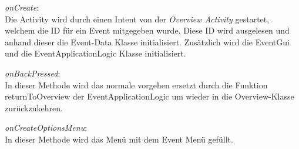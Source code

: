\textit{onCreate}:\\
Die Activity wird durch einen Intent von der \textit{Overview Activity} gestartet, welchem die ID für ein Event mitgegeben wurde. Diese ID wird ausgelesen und anhand dieser die Event-Data Klasse initialisiert. Zusätzlich wird die EventGui und die EventApplicationLogic Klasse initialisiert.

\textit{onBackPressed}:\\
In dieser Methode wird das normale vorgehen ersetzt durch die Funktion returnToOverview der EventApplicationLogic um wieder in die Overview-Klasse zurückzukehren.

\textit{onCreateOptionsMenu}:\\
In dieser Methode wird das Menü mit dem Event Menü gefüllt.\\

